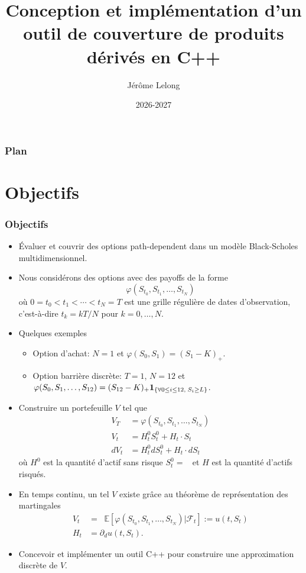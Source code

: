 \documentclass[10pt,color,leqno]{beamer}
\title{Conception et implémentation d'un outil de couverture de produits dérivés en C++}
\author[J. Lelong]{Jérôme Lelong}
\date{2026-2027}
\theoremstyle{plain}
\def\cf{{\mathcal F}}
\def\E{{\mathbb E}}
\newcommand{\ind}{{\bf 1}}
\newcommand{\expp}[1]{\mathop {\mathrm{e}^{ #1}}}
\def\ind#1{{\bf 1}_{\left\{#1\right\}}}
\begin{document}
\frame{\titlepage}

\begin{frame}
  \frametitle{Plan}
  \tableofcontents
\end{frame}

\section{Objectifs}

\begin{frame}[allowframebreaks]
  \frametitle{Objectifs}

  \begin{itemize}
    \item Évaluer et couvrir des options path-dependent dans un modèle Black-Scholes multidimensionnel.
    \item Nous considérons des options avec des payoffs de la forme
    \begin{equation*}
      \varphi(S_{t_0}, S_{t_1}, \dots, S_{t_N})
    \end{equation*}
    où $0 = t_0 < t_1 < \cdots < t_N = T$ est une grille régulière de dates d'observation, c'est-à-dire $t_k = kT / N$ pour $k=0,\dots,N$.
    \item Quelques exemples
    \begin{itemize}
      \item Option d'achat: $N=1$ et $\varphi(S_0, S_1) = (S_1 - K)_+$.
      \item Option barrière discrète: $T = 1$, $N=12$ et $\varphi(S_0, S_1, \dots, S_{12}) = (S_{12} - K)_+ \ind{\forall 0 \le i \le 12,\; S_i \ge L}$.
    \end{itemize}
    \pagebreak
    \item Construire un portefeuille $V$ tel que
    \begin{align*}
      V_T &= \varphi(S_{t_0}, S_{t_1}, \dots, S_{t_N}) \\
      V_t &= H^0_t S^0_t + H_t \cdot S_t \\
      dV_t &= H^0_t dS^0_t + H_t \cdot dS_t
    \end{align*}
    où $H^0$ est la quantité d'actif sans risque $S^0_t = \expp{r t}$ et $H$ est la quantité d'actifs risqués.
    \item En temps continu, un tel $V$ existe grâce au théorème de représentation des martingales
    \begin{align*}
      V_t &= \expp{-r (T-t)} \E[ \varphi(S_{t_0}, S_{t_1}, \dots, S_{t_N}) | \cf_t] := u(t, S_t) \\
      H_t &= \partial_d u(t, S_t).
    \end{align*}
    \item Concevoir et implémenter un outil C++ pour construire une approximation discrète de $V$.
  \end{itemize}

\end{frame}
\end{document}
